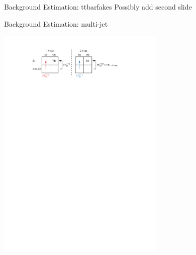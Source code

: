 \documentclass[11pt, xcolor={dvipsnames}, aspectratio=169]{beamer}
\begin{document}
\begin{frame}{Background Estimation: ttbarfakes}
  Possibly add second slide
\end{frame}


\begin{frame}{Background Estimation: multi-jet}
  \centering

  \includegraphics[width=0.6\textwidth]{fakefactors/regions}
\end{frame}

\end{document}
